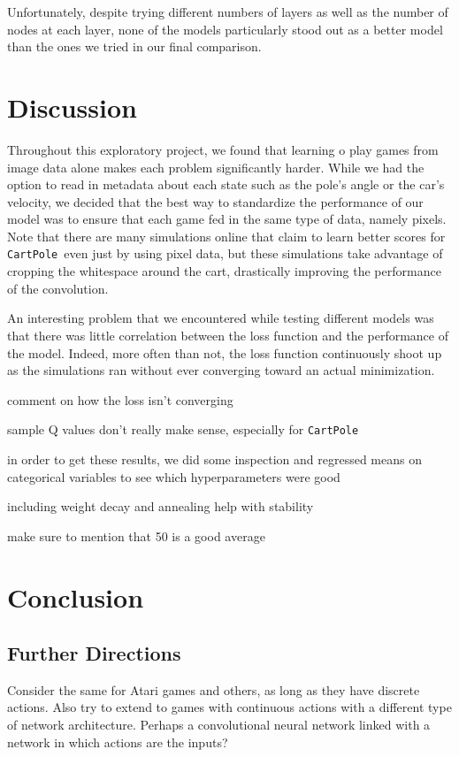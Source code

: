 \documentclass[11pt]{article}
\newcommand{\cp}{\texttt{CartPole}}
\begin{document}
Unfortunately, despite trying different numbers of layers as well as the number of nodes at each layer, none of the models particularly stood out as a better model than the ones we tried in our final comparison.

\section{Discussion}

Throughout this exploratory project, we found that learning o play games from image data alone makes each problem significantly harder. While we had the option to read in metadata about each state such as the pole's angle or the car's velocity, we decided that the best way to standardize the performance of our model was to ensure that each game fed in the same type of data, namely pixels. Note that there are many simulations online that claim to learn better scores for \cp~even just by using pixel data, but these simulations take advantage of cropping the whitespace around the cart, drastically improving the performance of the convolution.

An interesting problem that we encountered while testing different models was that there was little correlation between the loss function and the performance of the model. Indeed, more often than not, the loss function continuously shoot up as the simulations ran without ever converging toward an actual minimization.

comment on how the loss isn't converging

sample Q values don't really make sense, especially for \cp

in order to get these results, we did some inspection and regressed means on categorical variables to see which hyperparameters were good

including weight decay and annealing help with stability

make sure to mention that 50 is a good average

\section{Conclusion}

\subsection{Further Directions}

Consider the same for Atari games and others, as long as they have discrete actions. Also try to extend to games with continuous actions with a different type of network architecture. Perhaps a convolutional neural network linked with a network in which actions are the inputs?
\end{document}
